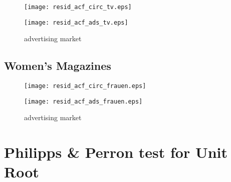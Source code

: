 \documentclass[12pt,a4paper]{scrreprt}
\begin{document}
\begin{appendices}
\begin{figure}[H]
\begin{minipage}{.5\textwidth}
	\centering
	\texttt{[image: resid\_acf\_circ\_tv.eps]}
\end{minipage}
\hfil
\begin{minipage}{.5\textwidth}
	\centering
	\caption{advertising market}
	\texttt{[image: resid\_acf\_ads\_tv.eps]}
\end{minipage}
\label{resid_acf_tv}
\end{figure}

\subsection{Women's Magazines}

\begin{figure}[H]
\begin{minipage}{.5\textwidth}
	\centering
	\texttt{[image: resid\_acf\_circ\_frauen.eps]}
\end{minipage}
\hfil
\begin{minipage}{.5\textwidth}
	\centering
	\caption{advertising market}
	\texttt{[image: resid\_acf\_ads\_frauen.eps]}
\end{minipage}
\label{resid_acf_frauen}
\end{figure}


\section{Philipps & Perron test for Unit Root}



\end{appendices}
\end{document}
